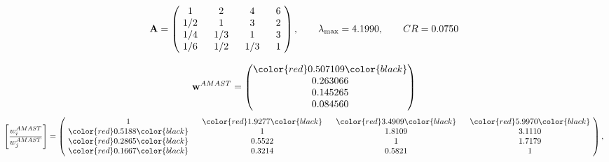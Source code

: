 \begin{example}
\begin{equation*}
\mathbf{A} =
\begin{pmatrix}
$\,\,$ 1 $\,\,$ & $\,\,$2$\,\,$ & $\,\,$4$\,\,$ & $\,\,$6 $\,\,$ \\
$\,\,$ 1/2$\,\,$ & $\,\,$ 1 $\,\,$ & $\,\,$3$\,\,$ & $\,\,$2 $\,\,$ \\
$\,\,$ 1/4$\,\,$ & $\,\,$ 1/3$\,\,$ & $\,\,$ 1 $\,\,$ & $\,\,$3 $\,\,$ \\
$\,\,$ 1/6$\,\,$ & $\,\,$ 1/2$\,\,$ & $\,\,$ 1/3$\,\,$ & $\,\,$ 1  $\,\,$ \\
\end{pmatrix},
\qquad
\lambda_{\max} =
4.1990,
\qquad
CR = 0.0750
\end{equation*}

\begin{equation*}
\mathbf{w}^{AMAST} =
\begin{pmatrix}
\color{red} 0.507109\color{black} \\
0.263066\\
0.145265\\
0.084560
\end{pmatrix}\end{equation*}
\begin{equation*}
\left[ \frac{{w}^{AMAST}_i}{{w}^{AMAST}_j} \right] =
\begin{pmatrix}
$\,\,$ 1 $\,\,$ & $\,\,$\color{red} 1.9277\color{black} $\,\,$ & $\,\,$\color{red} 3.4909\color{black} $\,\,$ & $\,\,$\color{red} 5.9970\color{black} $\,\,$ \\
$\,\,$\color{red} 0.5188\color{black} $\,\,$ & $\,\,$ 1 $\,\,$ & $\,\,$1.8109$\,\,$ & $\,\,$3.1110  $\,\,$ \\
$\,\,$\color{red} 0.2865\color{black} $\,\,$ & $\,\,$0.5522$\,\,$ & $\,\,$ 1 $\,\,$ & $\,\,$1.7179 $\,\,$ \\
$\,\,$\color{red} 0.1667\color{black} $\,\,$ & $\,\,$0.3214$\,\,$ & $\,\,$0.5821$\,\,$ & $\,\,$ 1  $\,\,$ \\
\end{pmatrix},
\end{equation*}


\end{example}
